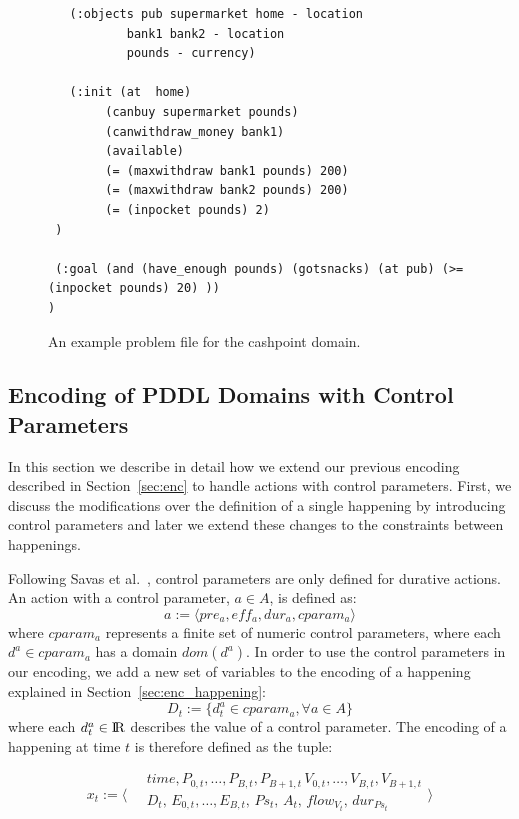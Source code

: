 \begin{figure}[thb]
\scriptsize
\begin{verbatim}
   (:objects pub supermarket home - location
           bank1 bank2 - location
           pounds - currency)
 
   (:init (at  home)
        (canbuy supermarket pounds)
        (canwithdraw_money bank1)
 		(available)
        (= (maxwithdraw bank1 pounds) 200)
        (= (maxwithdraw bank2 pounds) 200)
        (= (inpocket pounds) 2)
 )
		
 (:goal (and (have_enough pounds) (gotsnacks) (at pub) (>= (inpocket pounds) 20) ))
)      
\end{verbatim}
\caption{An example problem file for the cashpoint domain.}
\label{fig:cashpoint problem}
\end{figure}

\subsection{Encoding of PDDL Domains with Control Parameters}

In this section we describe in detail how we extend our previous encoding described in Section~\ref{sec:enc} to handle actions with control parameters. First, we discuss the modifications over the definition of a single happening by introducing control parameters and later we extend these changes to the constraints between happenings.

Following Savas et al.~\cite{savas2016planning}, control parameters are only defined for durative actions. An action with a control parameter, $a\in A$, is defined as:
$$
a := \langle pre_a, eff_a, dur_a, cparam_a \rangle
$$
where $cparam_a$ represents a finite set of numeric control parameters, where each $d^a \in cparam_a$ has a domain $dom(d^a)$. In order to use the control parameters in our encoding, we add a new set of variables to the encoding of a happening explained in Section~\ref{sec:enc_happening}:
$$
D_t := \{ d^a_t \in cparam_a, \forall a\in A \}
$$
where each $d^a_t\in {\rm I\!R}$ describes the value of a control parameter. The encoding of a happening at time $t$ is therefore defined as the tuple:

$$
x_t:=\Bigg \langle 
\begin{array}{l}
\quad time,P_{0,t},\ldots,P_{B,t},P_{B+1,t}\,V_{0,t},\ldots, V_{B,t},V_{B+1,t}\\
\quad D_t,\,E_{0,t},\ldots,E_{B,t},\,Ps_t,\,A_t,\,flow_{V_t},\,dur_{Ps_t}\\
\end{array}
\Bigg \rangle 
$$

